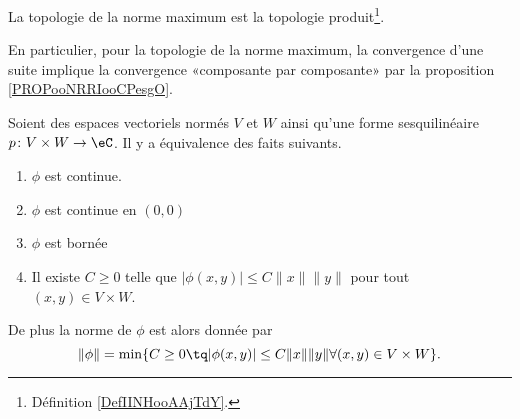 \begin{lemma}        \label{LEMooWVVCooIGgAdJ}
    La topologie de la norme maximum est la topologie produit\footnote{Définition \ref{DefIINHooAAjTdY}.}.
\end{lemma}

En particulier, pour la topologie de la norme maximum, la convergence d'une suite implique la convergence «composante par composante» par la proposition \ref{PROPooNRRIooCPesgO}.

\begin{proposition}      \label{PROPooQFTSooPFfbCc}
    Soient des espaces vectoriels normés \( V\) et \( W\) ainsi qu'une forme sesquilinéaire \( p\colon V\times W\to \eC\). Il y a équivalence des faits suivants.
    \begin{enumerate}
        \item
            \( \phi\) est continue.
        \item
            \( \phi\) est continue en \( (0,0)\)
        \item
            \( \phi\) est bornée
        \item
            Il existe \( C\geq 0\) telle que \( | \phi(x,y) |\leq C\| x \|\| y \|  \) pour tout \( (x,y)\in V\times W\).
    \end{enumerate}
    De plus la norme de \( \phi\) est alors donnée par
    \begin{equation}
        \| \phi \|=\min\{  C\geq 0\tq | \phi(x,y) |\leq C\| x \|\| y \|\forall (x,y)\in V\times W  \}.
    \end{equation}
\end{proposition}

